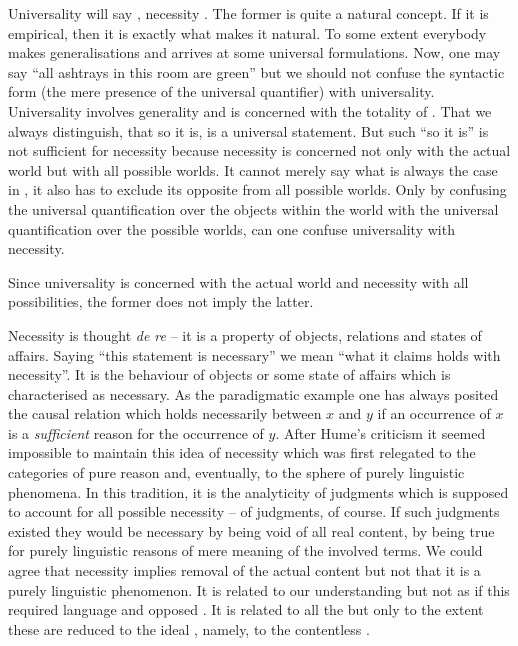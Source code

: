 Universality will say , necessity
.  The former is quite a natural
concept.  If it is empirical, then it is exactly what makes it
natural.  To some extent everybody makes generalisations and arrives
at some universal formulations.  Now, one may say ``all ashtrays in
this room are green'' but we should not confuse the syntactic form
(the mere presence of the universal quantifier) with universality. 
Universality involves generality and is concerned with the totality of
.  That we always distinguish, that so it is, is a
universal statement.  But such ``so it is'' is not sufficient for
necessity because necessity is concerned not only with the actual
world but with all possible worlds.  It cannot merely say what is always the
case in , it also has to exclude its opposite from all possible worlds. 
Only by confusing the universal quantification over the objects within
the world with the universal quantification over the possible worlds, 
can one confuse universality with necessity.

Since universality is concerned with the actual world and necessity
with all possibilities, the former does not imply the latter. 

Necessity is thought {\em de re} -- it is a property of objects, relations and
states of affairs.  Saying ``this statement is necessary'' we mean ``what it
claims holds with necessity''.  It is the behaviour of objects or some state of
affairs which is characterised as necessary. As the paradigmatic example one has
always posited the causal relation which holds necessarily between $x$ and $y$
if an occurrence of $x$ is a {\em sufficient} reason for the occurrence of $y$.
After Hume's criticism it seemed impossible to maintain this idea of necessity
which was first relegated to the categories of pure reason and, eventually, to
the sphere of purely linguistic phenomena.
In this tradition, it is the analyticity of judgments which is supposed to
account for all possible necessity -- of judgments, of course. If such judgments
existed they would be necessary by being void of all real content, by being true
for purely linguistic reasons of mere meaning of the involved terms.  We could
agree that necessity implies removal of the actual content but not that it is a
purely linguistic phenomenon.  It is related to our understanding but not as if
this required language and opposed .  It is related to all the
 but only to the extent these are reduced to the ideal
, namely, to the contentless .

